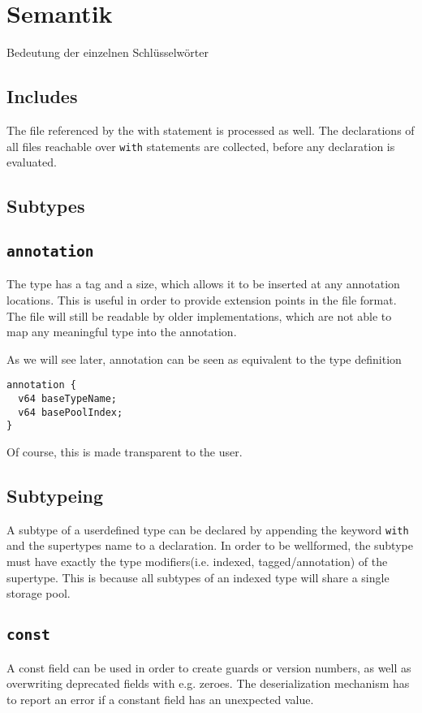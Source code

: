 \documentclass[a4paper,10pt]{article}
\begin{document}
\section{Semantik}

Bedeutung der einzelnen Schlüsselwörter

\subsection{Includes}
The file referenced by the with statement is processed as well. The declarations of all files reachable over \texttt{with} statements are collected, before any declaration is evaluated.

\subsection{Subtypes}

\subsection{\texttt{annotation}}
The type has a tag and a size, which allows it to be inserted at any annotation locations. This is useful in order to provide extension points in the file format. The file will still be readable by older implementations, which are not able to map any meaningful type into the annotation.

As we will see later, annotation can be seen as equivalent to the type definition
\begin{verbatim}
annotation {
  v64 baseTypeName;
  v64 basePoolIndex;
}
\end{verbatim}
Of course, this is made transparent to the user.

\subsection{Subtypeing}
A subtype of a userdefined type can be declared by appending the keyword \texttt{with} and the supertypes name to a declaration. In order to be wellformed, the subtype must have exactly the type modifiers(i.e. indexed, tagged/annotation) of the supertype. This is because all subtypes of an indexed type will share a single storage pool.

\subsection{\texttt{const}}
A const field can be used in order to create guards or version numbers, as well as overwriting deprecated fields with e.g. zeroes. The deserialization mechanism has to report an error if a constant field has an unexpected value.
\end{document}
